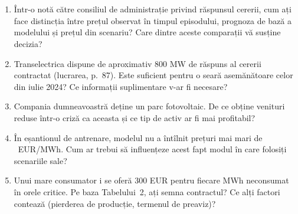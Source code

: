 \section{}
\begin{enumerate}
\item {}%
{Într-o notă către consiliul de administrație privind răspunsul cererii, cum ați face distincția între prețul observat în timpul episodului, prognoza de bază a modelului și prețul din scenariu? Care dintre aceste comparații vă susține decizia?}
\item {}%
{Transelectrica dispune de aproximativ 800 MW de răspuns al cererii contractat (lucrarea, p.~87). Este suficient pentru o seară asemănătoare celor din iulie 2024? Ce informații suplimentare v-ar fi necesare?}
\item {}%
{Compania dumneavoastră deține un parc fotovoltaic. De ce obține venituri reduse într-o criză ca aceasta și ce tip de activ ar fi mai profitabil?}
\item {}%
{În eșantionul de antrenare, modelul nu a întîlnit prețuri mai mari de \NtrainMax\ EUR/MWh. Cum ar trebui să influențeze acest fapt modul în care folosiți scenariile sale?}
\item {}%
{Unui mare consumator i se oferă 300 EUR pentru fiecare MWh neconsumat în orele critice. Pe baza Tabelului~2, ați semna contractul? Ce alți factori contează (pierderea de producție, termenul de preaviz)?}
\end{enumerate}

